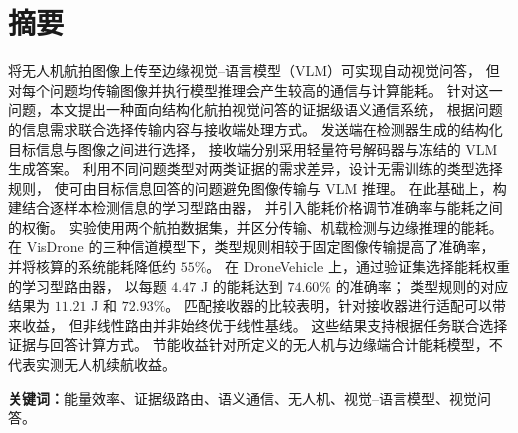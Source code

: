 \section*{摘要}

将无人机航拍图像上传至边缘视觉--语言模型（VLM）可实现自动视觉问答，
但对每个问题均传输图像并执行模型推理会产生较高的通信与计算能耗。
针对这一问题，本文提出一种面向结构化航拍视觉问答的证据级语义通信系统，
根据问题的信息需求联合选择传输内容与接收端处理方式。
发送端在检测器生成的结构化目标信息与图像之间进行选择，
接收端分别采用轻量符号解码器与冻结的 VLM 生成答案。
利用不同问题类型对两类证据的需求差异，设计无需训练的类型选择规则，
使可由目标信息回答的问题避免图像传输与 VLM 推理。
在此基础上，构建结合逐样本检测信息的学习型路由器，
并引入能耗价格调节准确率与能耗之间的权衡。
实验使用两个航拍数据集，并区分传输、机载检测与边缘推理的能耗。
在 VisDrone 的三种信道模型下，类型规则相较于固定图像传输提高了准确率，
并将核算的系统能耗降低约 $55\%$。
在 DroneVehicle 上，通过验证集选择能耗权重的学习型路由器，
以每题 $4.47$ J 的能耗达到 $74.60\%$ 的准确率；
类型规则的对应结果为 $11.21$ J 和 $72.93\%$。
匹配接收器的比较表明，针对接收器进行适配可以带来收益，
但非线性路由并非始终优于线性基线。
这些结果支持根据任务联合选择证据与回答计算方式。
节能收益针对所定义的无人机与边缘端合计能耗模型，不代表实测无人机续航收益。

\par\medskip
\noindent\textbf{关键词：}能量效率、证据级路由、语义通信、无人机、视觉--语言模型、视觉问答。
